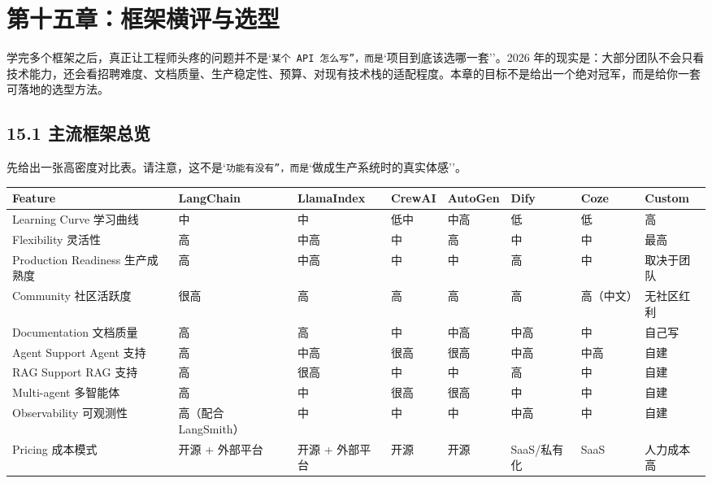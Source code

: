 \chapter{第十五章：框架横评与选型}

学完多个框架之后，真正让工程师头疼的问题并不是`\texttt{某个 API 怎么写''，而是}`项目到底该选哪一套''。2026 年的现实是：大部分团队不会只看技术能力，还会看招聘难度、文档质量、生产稳定性、预算、对现有技术栈的适配程度。本章的目标不是给出一个绝对冠军，而是给你一套可落地的选型方法。


\section{15.1 主流框架总览}

先给出一张高密度对比表。请注意，这不是`\texttt{功能有没有''，而是}`做成生产系统时的真实体感''。


\begingroup
\scriptsize
\setlength{\tabcolsep}{3pt}
\begin{longtable}{|p{}|p{}|p{}|p{}|p{}|p{}|p{}|p{}|}
\hline
Feature & LangChain & LlamaIndex & CrewAI & AutoGen & Dify & Coze & Custom \\ \hline
Learning Curve 学习曲线 & 中 & 中 & 低中 & 中高 & 低 & 低 & 高 \\ \hline
Flexibility 灵活性 & 高 & 中高 & 中 & 高 & 中 & 中 & 最高 \\ \hline
Production Readiness 生产成熟度 & 高 & 中高 & 中 & 中 & 高 & 中 & 取决于团队 \\ \hline
Community 社区活跃度 & 很高 & 高 & 高 & 高 & 高 & 高（中文） & 无社区红利 \\ \hline
Documentation 文档质量 & 高 & 高 & 中 & 中高 & 中高 & 中 & 自己写 \\ \hline
Agent Support Agent 支持 & 高 & 中高 & 很高 & 很高 & 中高 & 中高 & 自建 \\ \hline
RAG Support RAG 支持 & 高 & 很高 & 中 & 中 & 高 & 中 & 自建 \\ \hline
Multi-agent 多智能体 & 高 & 中 & 很高 & 很高 & 中 & 中 & 自建 \\ \hline
Observability 可观测性 & 高（配合 LangSmith） & 中 & 中 & 中 & 中高 & 中 & 自建 \\ \hline
Pricing 成本模式 & 开源 + 外部平台 & 开源 + 外部平台 & 开源 & 开源 & SaaS/私有化 & SaaS & 人力成本高 \\ \hline
\end{longtable}
\endgroup

